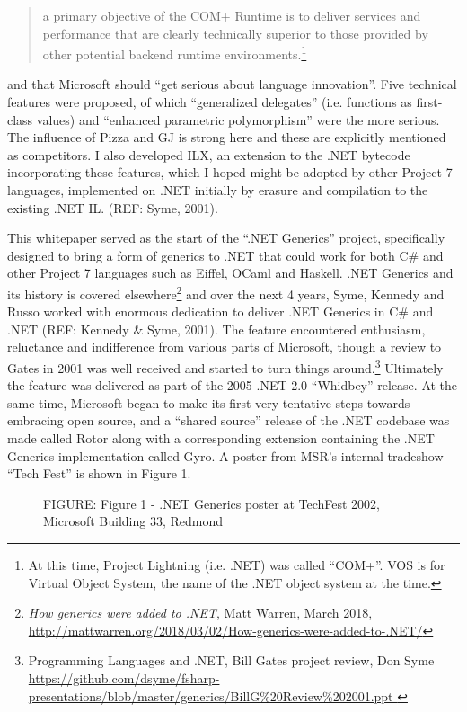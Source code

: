 \documentclass[acmsmall,review]{acmart}\settopmatter{printfolios=true,printccs=false,printacmref=false}
\begin{document}
\begin{quote}
a primary objective of the COM+ Runtime is to deliver services and performance that are clearly technically superior to those provided by other potential backend runtime environments.\footnote{At this time, Project Lightning (i.e. .NET) was called “COM+”.  VOS is for Virtual Object System, the name of the .NET object system at the time.} 
\end{quote}
and that Microsoft should “get serious about language innovation”.  Five technical features were proposed, of which “generalized delegates” (i.e. functions as first-class values) and “enhanced parametric polymorphism” were the more serious.  The influence of Pizza and GJ is strong here and these are explicitly mentioned as competitors. I also developed ILX, an extension to the .NET bytecode incorporating these features, which I hoped might be adopted by other Project 7 languages, implemented on .NET initially by erasure and compilation to the existing .NET IL. (REF: Syme, 2001).


This whitepaper served as the start of the “.NET Generics” project, specifically designed to bring a form of generics to .NET that could work for both C\# and other Project 7 languages such as Eiffel, OCaml and Haskell. .NET Generics and its history is covered elsewhere\footnote{\textit{How generics were added to .NET}, Matt Warren, March 2018, \url{http://mattwarren.org/2018/03/02/How-generics-were-added-to-.NET/}} and over the next 4 years, Syme, Kennedy and Russo worked with enormous dedication to deliver .NET Generics in C\# and .NET (REF: Kennedy \& Syme, 2001). The feature encountered enthusiasm, reluctance and indifference from various parts of Microsoft, though a review to Gates in 2001 was well received and started to turn things around.\footnote{ Programming Languages and  .NET, Bill Gates project review, Don Syme \url{https://github.com/dsyme/fsharp-presentations/blob/master/generics/BillG\%20Review\%202001.ppt }}   Ultimately the feature was delivered as part of the 2005 .NET 2.0 “Whidbey” release.  At the same time, Microsoft began to make its first very tentative steps towards embracing open source, and a “shared source” release of the .NET codebase was made called Rotor along with a corresponding extension containing the .NET Generics implementation called Gyro.  A poster from MSR’s internal tradeshow “Tech Fest” is shown in Figure 1. 

\begin{figure}

FIGURE: Figure 1 - .NET Generics poster at TechFest 2002, Microsoft Building 33, Redmond
\end{figure}
\end{document}
